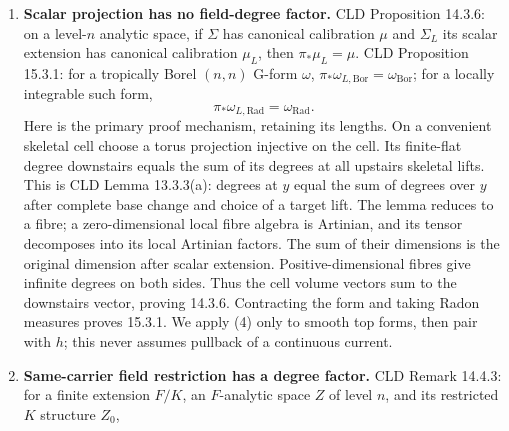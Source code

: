 \documentclass[11pt]{article}
\begin{document}
\begin{enumerate}
  finite on a compact moment domain. Lower-dimensional cells have no top
  measure. Compact moment images are finite polyhedra by the
  polyhedrality assertion of CLD Theorem 12.2.4. The dimension bound is
  specifically CLD 12.2.10(1)--(2):
  \(\dim_{\mathrm{trop},x}f\le d_K(x)\le\dim_xX\) and, for compact
  \(X\), \(\dim f_{\mathrm{trop}}(X)=\sup_x\dim_{\mathrm{trop},x}f\).
  Thus compact curve images have dimension at most one. We do not use a
  claim that a moment image always has dimension equal to its source;
  constant moments rule out that reading. CLD 7.3.5 defines integration
  currents for locally integrable multipliers; a continuous finite
  multiplier is locally integrable. Section 8 proves the carrier
  total-variation estimate needed here, before any possibly cancelling
  signed pushforward.
\item
  \textbf{Scalar projection has no field-degree factor.} CLD Proposition
  14.3.6: on a level-\(n\) analytic space, if \(\Sigma\) has canonical
  calibration \(\mu\) and \(\Sigma_L\) its scalar extension has
  canonical calibration \(\mu_L\), then \(\pi_*\mu_L=\mu\). CLD
  Proposition 15.3.1: for a tropically Borel \((n,n)\) G-form
  \(\omega\), \(\pi_*\omega_{L,\mathrm{Bor}}=\omega_{\mathrm{Bor}}\);
  for a locally integrable such form, \[
             \pi_*\omega_{L,\mathrm{Rad}}
                       =\omega_{\mathrm{Rad}}.          \tag{4}
  \] Here is the primary proof mechanism, retaining its lengths. On a
  convenient skeletal cell choose a torus projection injective on the
  cell. Its finite-flat degree downstairs equals the sum of its degrees
  at all upstairs skeletal lifts. This is CLD Lemma 13.3.3(a): degrees
  at \(y\) equal the sum of degrees over \(y\) after complete base
  change and choice of a target lift. The lemma reduces to a fibre; a
  zero-dimensional local fibre algebra is Artinian, and its tensor
  decomposes into its local Artinian factors. The sum of their
  dimensions is the original dimension after scalar extension.
  Positive-dimensional fibres give infinite degrees on both sides. Thus
  the cell volume vectors sum to the downstairs vector, proving 14.3.6.
  Contracting the form and taking Radon measures proves 15.3.1. We apply
  (4) only to smooth top forms, then pair with \(h\); this never assumes
  pullback of a continuous current.
\item
  \textbf{Same-carrier field restriction has a degree factor.} CLD
  Remark 14.4.3: for a finite extension \(F/K\), an \(F\)-analytic space
  \(Z\) of level \(n\), and its restricted \(K\) structure \(Z_0\),

\end{enumerate}
\end{document}
